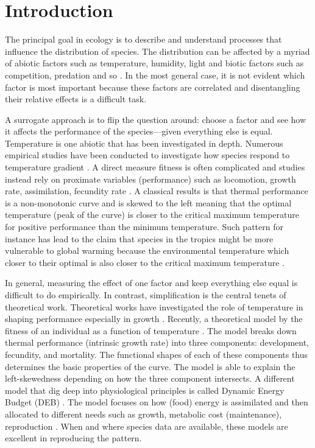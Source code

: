 \section*{Introduction}
The principal goal in ecology is to describe and understand processes that influence the distribution of species.
The distribution can be affected by a myriad of abiotic factors such as temperature, humidity, light  and  biotic factors such as competition, predation and so \citep{Krebs2000}.
In the most general case, it is not evident which factor is most important because these factors are correlated and disentangling their relative effects is a difficult task.

A surrogate approach is to flip the question around: choose a factor and see how it affects the performance of the species---given everything else is equal.
Temperature is one abiotic that has been investigated in depth.
Numerous empirical studies have been conducted to investigate how species respond to temperature gradient \citep[e.g.,][]{Angilletta2009}.
A direct measure fitness is often complicated and studies instead rely on proximate variables (performance) such as locomotion, growth rate, assimilation, fecundity rate \citep[][and reference therein]{Angilletta2009}.
A classical results is that thermal performance is a non-monotonic curve and is skewed to the left meaning that the optimal temperature (peak of the curve) is closer to the critical maximum temperature for positive performance than the minimum temperature. 
Such pattern for instance has lead to the claim that species in the tropics might be more vulnerable to global warming because the environmental temperature which closer to their optimal  is also  closer to the critical maximum temperature \citep{Deutsch2008}.

In general, measuring the effect of one factor and keep everything else equal  is difficult to do empirically.
In contrast, simplification is the central tenets of theoretical work.
Theoretical works have investigated the role of temperature in shaping performance especially in growth \citep{VandH1996, Kozlowski2004}.
Recently, a theoretical model by \citet{Amarasekare2012} the fitness of an individual as a function of temperature \citep{Amarasekare2012}.
The model  breaks down thermal performance (intrinsic growth rate)  into three components: development, fecundity, and mortality.
The functional shapes of each of these components thus determines the basic properties of the curve.
The model is able to explain the left-skewedness depending on how the three component intersects.
A different model that dig deep into physiological principles is called Dynamic Energy Budget (DEB) \citep{Kooijman2009}.
The model focuses on how (food) energy is assimilated and then allocated to different needs such as growth, metabolic cost (maintenance), reproduction \citep{Kooijman2009}.
When and where species data are available, these models are excellent in reproducing the pattern. 

